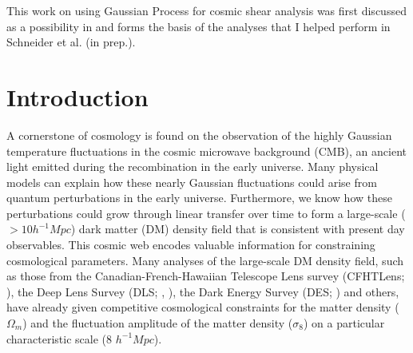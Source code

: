  
This work on using Gaussian Process for cosmic shear analysis 
was first discussed as a possibility in  \citep{Schneider2014}  and 
forms the basis of the analyses that I helped perform 
in Schneider et al. (in prep.). 

\section{Introduction} 

A cornerstone of cosmology is found on the 
observation of the highly Gaussian temperature fluctuations in the cosmic microwave 
background (CMB), an ancient light emitted during the recombination in the early
universe. Many physical models can explain how these
nearly Gaussian fluctuations could arise from quantum perturbations in the 
early universe. Furthermore, we know how these perturbations could grow
through linear transfer over time to form a large-scale ($> 10 h^{-1} Mpc$) 
dark matter (DM) density field that is consistent with present
day observables. 
This cosmic web encodes valuable information for constraining cosmological
parameters. Many analyses of the large-scale DM density field, such as those from
the Canadian-French-Hawaiian Telescope Lens survey (CFHTLens;
\citealt{Kilbinger2013}), the Deep Lens Survey
(DLS; \citealt{Jee2013a}, \citealt{Wittman2002}), the Dark Energy Survey (DES; \citealt{Abbott2016}) and others, 
have already given competitive cosmological constraints for 
 the matter density ($\Omega_m$) and the fluctuation amplitude 
of the matter density ($\sigma_8$) on a particular characteristic scale (8
$h^{-1} Mpc$). 


